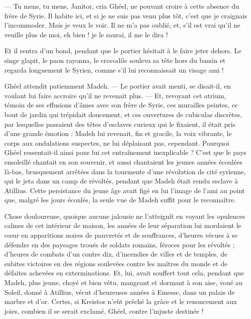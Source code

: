 \documentclass[a4paper, 11pt, oneside, polutonikogreek, french]{article}
\begin{document}
--- Tu mens, tu mens, Janitor, cria Ghéel, ne pouvant croire à cette absence du frère de Syrie. Il habite ici, et si je ne suis pas venu plus tôt, c'est que je craignais l'incommoder. Mais je veux le voir. Il ne m'a pas oublié, et, s'il est vrai qu'il ne veuille plus de moi, eh bien ! je le saurai, il me le dira !

Et il rentra d'un bond, pendant que le portier hésitait à le faire jeter dehors. Le singe glapit, le paon rayonna, le crocodile souleva sa tête hors du bassin et regarda longuement le Syrien, comme s'il lui reconnaissait un visage ami !

Ghéel attendit patiemment Madeh. --- Le portier avait menti, se disait-il, en voulant lui faire accroire qu'il ne revenait plus. --- Et, revoyant cet atrium, témoin de ses effusions d'âmes avec son frère de Syrie, ces murailles peintes, ce bout de jardin qui trépidait doucement, et ces ouvertures de cubiculas discrètes, par lesquelles passaient des têtes d'esclaves curieux qui le fixaient, il était pris d'une grande émotion : Madeh lui revenait, fin et gracile, la voix vibrante, le corps aux ondulations suspectes, ne lui déplaisant pas, cependant. Pourquoi Ghéel ressentait-il ainsi pour lui cet entraînement inexplicable ? C'est que le pays ensoleillé chantait en son souvenir, et aussi chantaient les jeunes années écoulées là-bas, brusquement arrêtées dans la tourmente d'une révolution de cité syrienne, qui le jeta dans un camp de révoltés, pendant que Madeh était rendu esclave à Atillius. Cette persistance du jeune âge avait figé en lui l'image de l'ami au point que, malgré les jours écoulés, la seule vue de Madeh suffit pour le reconnaître.

Chose douloureuse, quoique aucune jalousie ne l'atteignît en voyant les opulences calmes de cet intérieur de maison, les années de leur séparation lui mordaient le cœur en apparitions noires de pauvretés et de souffrances, d'heures vécues à se défendre en des paysages troués de soldats romains, féroces pour les révoltés ; d'heures de combats d'un contre dix, d'incendies de villes et de temples, de subites victoires en des régions soulevées contre les maîtres du monde et de défaites achevées en exterminations. Et, lui, avait souffert tout cela, pendant que Madeh, plus jeune, choyé et bien vêtu, mangeant et dormant à son aise, voué au Soleil, donné à Atillius, vécut d'heureuses années à Emesse, dans un palais de marbre et d'or. Certes, si Kreistos n'eût prêché la grâce et le renoncement aux joies, combien il se serait exclamé, Ghéel, contre l'injuste destinée !
\end{document}
